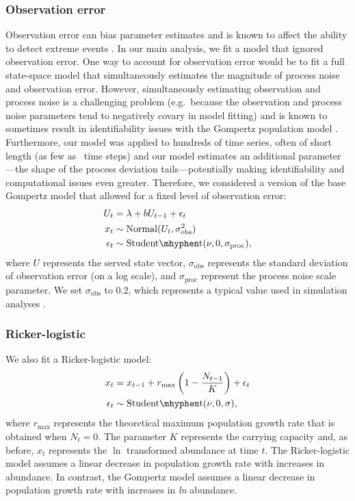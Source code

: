 \subsubsection{Observation error} Observation error can bias parameter
estimates \citep{knape2012} and is known to affect the ability to detect extreme
events \citep{ward2007}. In our main analysis, we fit a model that ignored
observation error. One way to account for observation error would be to fit a
full state-space model that simultaneously estimates the magnitude of process
noise and observation error. However, simultaneously estimating observation and
process noise is a challenging problem (e.g.\ because the observation and
process noise parameters tend to negatively covary in model fitting) and is
known to sometimes result in identifiability issues with the Gompertz
population model \citep{knape2008}. Furthermore, our model was applied to
hundreds of time series, often of short length (as few as \minTimeSteps\ time
steps) and our model estimates an additional parameter---the shape of the
process deviation tails---potentially making identifiability and computational
issues even greater. Therefore, we considered a version of the base Gompertz
model that allowed for a fixed level of observation error:
\begin{align}
U_t &= \lambda + b U_{t-1} + \epsilon_t\\
x_t &\sim \mathrm{Normal}(U_t, \sigma_\mathrm{obs}^2)\\
\epsilon_t &\sim \mathrm{Student\mhyphen t}(\nu, 0, \sigma_\mathrm{proc}),
\end{align}
where \(U\) represents the served state vector, \(\sigma_\mathrm{obs}\)
represents the standard deviation of observation error (on a log scale), and
\(\sigma_\mathrm{proc}\) represent the process noise scale parameter. We set
\(\sigma_\mathrm{obs}\) to \(0.2\), which represents a typical value used in
simulation analyses \citep[e.g.][]{valpine2002, thorson2014b}.

\subsubsection{Ricker-logistic} We also fit a Ricker-logistic model:
\begin{align}
x_t &= x_{t-1} + r_{\mathrm{max}}\left(1 - \frac{N_{t-1}}{K}\right) + \epsilon_t\\
\epsilon_t &\sim \mathrm{Student\mhyphen t}(\nu, 0, \sigma),
\end{align}
where \(r_\mathrm{max}\) represents the theoretical maximum population growth
rate that is obtained when \(N_t = 0\). The parameter \(K\) represents the
carrying capacity and, as before, \(x_t\) represents the \(\ln\) transformed
abundance at time \(t\). The Ricker-logistic model assumes a linear decrease in
population growth rate with increases in abundance. In contrast, the Gompertz
model assumes a linear decrease in population growth rate with increases in
\textit{ln} abundance.

